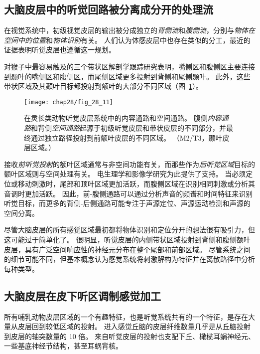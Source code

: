 \subsection{大脑皮层中的听觉回路被分离成分开的处理流}

在视觉系统中，初级视觉皮层的输出被分成独立的\textit{背侧流}和\textit{腹侧流}，分别与\textit{物体在空间中的位置}和\textit{物体识别}有关。
人们认为体感皮层中也存在类似的分工，最近的证据表明听觉皮层也遵循这一规划。


对猴子中最容易触及的三个带状区解剖学跟踪研究表明，嘴侧区和腹侧区主要连接到颞叶的嘴侧区和腹侧区，而尾侧区域更多投射到背侧和尾侧颞叶。
此外，这些带状区域及其颞叶目标都投射到额叶的大部分不同区域（图~\ref{fig:28_11}）。


\begin{figure}[htbp]
	\centering
	\texttt{[image: chap28/fig\_28\_11]}
	\caption{在灵长类动物听觉皮层系统中的内容通路和空间通路。
		腹侧\textit{内容通路}和背侧\textit{空间通路}起源于初级听觉皮层和带状皮层的不同部分，并最终通过独立路径投射到前额叶皮层的不同区域\cite{rauschecker2000mechanisms}。
		（M2/T3，颞叶皮层区域。）}
	\label{fig:28_11}
\end{figure}


接收\textit{前听觉投射}的额叶区域通常与非空间功能有关，而那些作为\textit{后听觉区域}目标的额叶区域则与空间处理有关。
电生理学和影像学研究为此提供了支持。
当必须定位或移动刺激时，尾部和顶叶区域更加活跃，而腹侧区域在识别相同刺激或分析其音调时更加活跃。
因此，前-腹侧通路可以通过分析声音的频谱和时间特征来识别听觉目标，而更多的背侧-后侧通路可能专注于声源定位、声源运动检测和声源的空间分离。


尽管大脑皮层的所有感觉区域最初都将物体识别和定位分开的想法很有吸引力，但这可能过于简单化了。
很明显，听觉皮层的内侧带状区域投射到背侧和腹侧额叶皮层，具有广泛空间响应性的神经元分布在整个尾部和前部区域。
尽管系统之间的细节可能不同，但基本概念认为感觉系统将刺激解构为特征并在离散路径中分析每种类型。



\subsection{大脑皮层在皮下听区调制感觉加工}

所有哺乳动物皮层区域的一个有趣特征，也是听觉系统共有的一个特征，是存在大量从皮层回到较低区域的投射。
进入感觉丘脑的皮层纤维数量几乎是从丘脑投射到皮层的轴突数量的 10 倍。
来自听觉皮层的投射也支配下丘、橄榄耳蜗神经元、一些基底神经节结构，甚至耳蜗背核。


